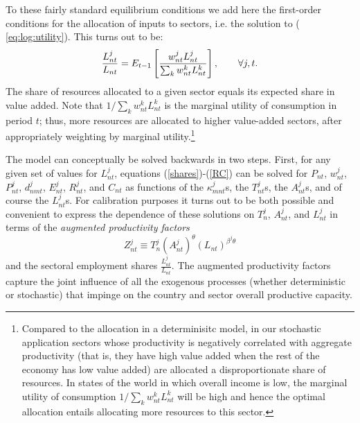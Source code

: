 \documentclass[12pt]{article}
\begin{document}
To these fairly standard equilibrium conditions we add here the first-order
conditions for the allocation of inputs to sectors, i.e. the solution to (%
\ref{eq:log:utility}). This turns out to be: 
\begin{equation}
\frac{L_{nt}^{j}}{L_{nt}}=E_{t-1}\left[ \frac{w_{nt}^{j}L_{nt}^{j}}{%
\sum_{k}w_{nt}^{k}L_{nt}^{k}}\right] ,\qquad \forall j,t.  \label{eq:FOC}
\end{equation}%
The share of resources allocated to a given sector equals its expected share
in value added. Note that $1/\sum_{k}w_{nt}^{k}L_{nt}^{k}$ is the marginal
utility of consumption in period $t$; thus, more resources are allocated to
higher value-added sectors, after appropriately weighting by marginal
utility.\footnote{%
Compared to the allocation in a determinisitc model, in our stochastic
application sectors whose productivity is negatively correlated with
aggregate productivity (that is, they have high value added when the rest of
the economy has low value added) are allocated a disproportionate share of
resources. In states of the world in which overall income is low, the
marginal utility of consumption $1/\sum_{k}w_{nt}^{k}L_{nt}^{k}$ will be
high and hence the optimal allocation entails allocating more resources to
this sector.}

The model can conceptually be solved backwards in two steps. First, for any
given set of values for $L_{nt}^{j}$, equations (\ref{shares})-(\ref{RC})
can be solved for $P_{nt}$, $w_{nt}^{j}$, $P_{nt}^{j}$, $d_{nmt}^{j}$, $%
E_{nt}^{j}$, $R_{nt}^{j}$, and $C_{nt}$ as functions of the $\kappa
_{mnt}^{j}$s, the $T_{nt}^{j}$s, the $A_{nt}^{j}$s, and of course the $%
L_{nt}^{j}$s. For calibration purposes it turns out to be both possible and
convenient to express the dependence of these solutions on $T_{n}^{j}$, $%
A_{nt}^{j}$, and $L_{nt}^{j}$ in terms of the \textit{augmented productivity
factors}%
\begin{equation}
Z_{nt}^{j}\equiv T_{n}^{j}\left( A_{nt}^{j}\right) ^{\theta }\left(
L_{nt}\right) ^{\beta ^{j}\theta }  \label{productivityfactor}
\end{equation}%
and the sectoral employment shares $\frac{L_{nt}^{j}}{L_{nt}}$. The
augmented productivity factors capture the joint influence of all the
exogenous processes (whether deterministic or stochastic) that impinge on
the country and sector overall productive capacity.
\end{document}
